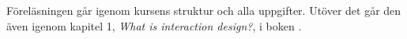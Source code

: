 Föreläsningen går igenom kursens struktur och alla uppgifter.
Utöver det går den även igenom kapitel 1, \emph{What is interaction design?}, 
i boken  \citep{Sharp2011idb}.
